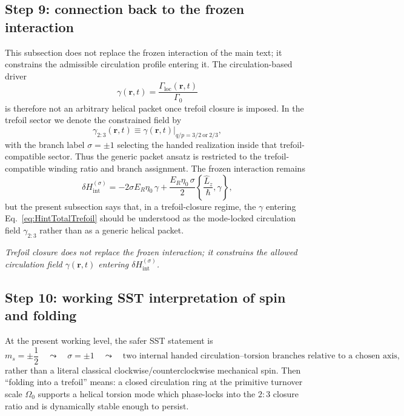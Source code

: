 \documentclass[11pt,a4paper]{article}
\begin{document}
    \subsection{Step 9: connection back to the frozen interaction}
        This subsection does not replace the frozen interaction of the main text; it constrains the admissible circulation profile entering it. The circulation-based driver
        \begin{equation}
            \gamma(\mathbf r,t)=\frac{\Gamma_{\mathrm{loc}}(\mathbf r,t)}{\Gamma_0}
            \label{eq:gammaFromTrefoil}
        \end{equation}
        is therefore not an arbitrary helical packet once trefoil closure is imposed. In the trefoil sector we denote the constrained field by
        \begin{equation}
            \gamma_{2{:}3}(\mathbf r,t)
            \equiv
            \gamma(\mathbf r,t)\Big|_{q/p=3/2\ \text{or}\ 2/3},
            \label{eq:gamma23Def}
        \end{equation}
        with the branch label \(\sigma=\pm 1\) selecting the handed realization inside that trefoil-compatible sector. Thus the generic packet ansatz is restricted to the trefoil-compatible winding ratio and branch assignment. The frozen interaction remains
        \begin{equation}
            \delta H_{\mathrm{int}}^{(\sigma)}
            =
            -2\sigma E_R\eta_0\,\gamma
            +
            \frac{E_R\eta_0\,\sigma}{2}
            \left\{\frac{\hat L_z}{\hbar},\gamma\right\},
            \label{eq:HintTotalTrefoil}
        \end{equation}
        but the present subsection says that, in a trefoil-closure regime, the \(\gamma\) entering Eq.~\eqref{eq:HintTotalTrefoil} should be understood as the mode-locked circulation field \(\gamma_{2{:}3}\) rather than as a generic helical packet.
        
        \medskip\noindent\textit{Trefoil closure does not replace the frozen interaction; it constrains the allowed circulation field $\gamma(\mathbf r,t)$ entering $\delta H_{\mathrm{int}}^{(\sigma)}$.}
    
    \subsection{Step 10: working SST interpretation of spin and folding}
        At the present working level, the safer SST statement is
        \begin{equation}
            m_s=\pm\frac12
            \quad\leadsto\quad
            \sigma=\pm 1
            \quad\leadsto\quad
            \text{two internal handed circulation--torsion branches relative to a chosen axis,}
            \label{eq:spinbranchworkingTrefoil}
        \end{equation}
        rather than a literal classical clockwise/counterclockwise mechanical spin. Then ``folding into a trefoil'' means: a closed circulation ring at the primitive turnover scale \(\Omega_0\) supports a helical torsion mode which phase-locks into the \(2{:}3\) closure ratio and is dynamically stable enough to persist.
        
\end{document}

